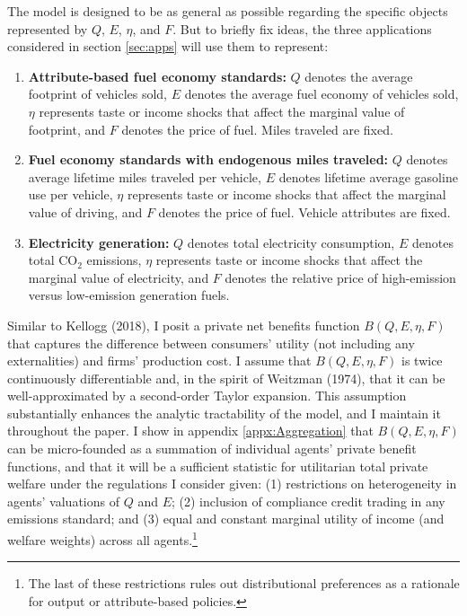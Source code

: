 \documentclass[12pt]{article}
\begin{document}
The model is designed to be as general as possible regarding the specific objects represented by $Q$, $E$, $\eta$, and $F$. But to briefly fix ideas, the three applications considered in section \ref{sec:apps} will use them to represent:
\begin{enumerate}
\item \textbf{Attribute-based fuel economy standards:} $Q$ denotes the average footprint of vehicles sold, $E$ denotes the average fuel economy of vehicles sold, $\eta$ represents taste or income shocks that affect the marginal value of footprint, and $F$ denotes the price of fuel. Miles traveled are fixed.
\item \textbf{Fuel economy standards with endogenous miles traveled:} $Q$ denotes average lifetime miles traveled per vehicle, $E$ denotes lifetime average gasoline use per vehicle, $\eta$ represents taste or income shocks that affect the marginal value of driving, and $F$ denotes the price of fuel. Vehicle attributes are fixed.
\item \textbf{Electricity generation:} $Q$ denotes total electricity consumption, $E$ denotes total CO$_{\text{2}}$ emissions, $\eta$ represents taste or income shocks that affect the marginal value of electricity, and $F$ denotes the relative price of high-emission versus low-emission generation fuels.
\end{enumerate}

Similar to Kellogg (2018), I posit a private net benefits function $B(Q,E,\eta,F)$ that captures the difference between consumers' utility (not including any externalities) and firms' production cost. I assume that $B(Q,E,\eta,F)$ is twice continuously differentiable and, in the spirit of Weitzman (1974), that it can be well-approximated by a second-order Taylor expansion. This assumption substantially enhances the analytic tractability of the model, and I maintain it throughout the paper. I show in appendix \ref{appx:Aggregation} that $B(Q,E,\eta,F)$ can be micro-founded as a summation of individual agents' private benefit functions, and that it will be a sufficient statistic for utilitarian total private welfare under the regulations I consider given: (1) restrictions on heterogeneity in agents' valuations of $Q$ and $E$; (2) inclusion of compliance credit trading in any emissions standard; and (3) equal and constant marginal utility of income (and welfare weights) across all agents.\footnote{The last of these restrictions rules out distributional preferences as a rationale for output or attribute-based policies.}
\end{document}
